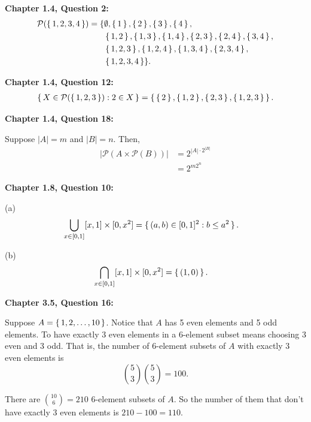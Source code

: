 \documentclass[12pt]{article}
\begin{document}
\noindent \textbf{Chapter 1.4, Question 2:}
\begin{align*}
    \mathcal{P}(\set{1,2,3,4}) = \{ & \emptyset, \set{1}, \set{2}, \set{3}, \set{4},                    \\
                                    & \set{1,2}, \set{1,3}, \set{1,4}, \set{2,3}, \set{2,4}, \set{3,4}, \\
                                    & \set{1,2,3}, \set{1,2,4}, \set{1,3,4}, \set{2,3,4},               \\
                                    & \set{1,2,3,4} \}.
\end{align*}

\noindent \textbf{Chapter 1.4, Question 12:}
\begin{align*}
    \set{X \in \mathcal{P}(\set{1,2,3}) : 2 \in X} = \set{\set{2}, \set{1,2}, \set{2,3}, \set{1,2,3}}.
\end{align*}

\noindent \textbf{Chapter 1.4, Question 18:}

Suppose $|A| = m$ and $|B| = n$. Then,
\begin{align*}
    |\mathcal{P}(A \times \mathcal{P}(B))| & = 2^{|A| \cdot 2^{|B|}} \\
                                           & = 2^{m2^{n}}
\end{align*}

\noindent \textbf{Chapter 1.8, Question 10:}

(a)
\begin{align*}
    \bigcup_{x \in [0,1]}[x,1] \times [0, x^2] & = \set{(a,b) \in [0,1]^2 : b \leq a^2}.
\end{align*}

(b)
\begin{align*}
    \bigcap_{x \in [0,1]}[x,1] \times [0, x^2] & = \set{(1,0)}.
\end{align*}

\noindent \textbf{Chapter 3.5, Question 16:}

Suppose $A = \set{1,2, \ldots , 10}$.
Notice that $A$ has 5 even elements and 5 odd elements.
To have exactly 3 even elements in a 6-element subset means choosing 3 even and 3 odd.
That is, the number of 6-element subsets of $A$ with exactly 3 even elements is
\begin{equation*}
    \binom{5}{3}\binom{5}{3} = 100.
\end{equation*}

There are $\binom{10}{6}=210$ 6-element subsets of $A$.
So the number of them that don't have exactly 3 even elements is $210 - 100 = 110$.
\end{document}
